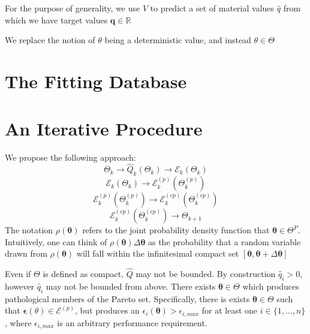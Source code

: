 For the purpose of generality, we use $\hat{V}$ to predict a set of material values $\hat{q}$ from which we have target values $\bm{q}\in\mathbb{R}$


We replace the notion of $\theta$ being a deterministic value, and instead $\theta\in\Theta$

\section{The Fitting Database}

\section{An Iterative Procedure}
We propose the following approach:
\begin{equation}
	\Theta_k \rightarrow \hat{Q}_k(\Theta_k) \rightarrow \mathcal{E}_k(\Theta_k)
\end{equation}
\begin{equation}
	\mathcal{E}_k(\Theta_k) \rightarrow \mathcal{E}_k^{(p)}(\Theta_k^{(p)})
\end{equation}
\begin{equation}
	\mathcal{E}_k^{(p)}(\Theta_k^{(p)}) \rightarrow \mathcal{E}_k^{(cp)}(\Theta_k^{(cp)})
\end{equation}
\begin{equation}
	      \mathcal{E}_k^{(cp)}(\Theta_k^{(cp)}) \rightarrow \Theta_{k+1}
\end{equation}
The notation $\rho(\bm{\theta})$ refers to the joint probability density function that $\bm{\theta} \in \Theta^{P}$.
Intuitively, one can think of
$\rho(\bm{\theta})\Delta\bm{\theta}$
as the probability that a random variable drawn from $\rho(\bm{\theta})$ will fall within the infinitesimal compact set $[\bm{\theta},\bm{\theta}+\Delta\bm{\theta}]$

Even if $\Theta$ is defined as compact, $\hat{Q}$ may not be bounded.  By construction $\hat{q}_i > 0 $, however $\hat{q}_i$ may not be bounded from above.  There exists $\bm{\theta} \in \Theta$ which produces pathological members of the Pareto set.  Specifically, there is exists $\bm{\theta} \in \Theta$ such that $\bm{\epsilon}(\theta) \in \mathcal{E}^(p)$, but produces an $\epsilon_i(\bm{\theta}) > \epsilon_{i,max}$ for at least one $i\in\{1,...,n\}$, where $\epsilon_{i,max}$ is an arbitrary performance requirement.

